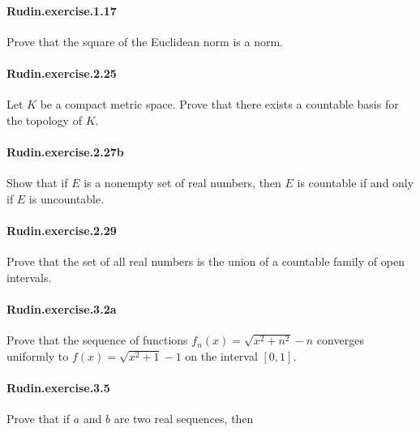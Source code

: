 \documentclass{article}
\begin{document}
\paragraph{Rudin.exercise.1.17} Prove that the square of the Euclidean norm is a norm.



\paragraph{Rudin.exercise.2.25} Let $K$ be a compact metric space. Prove that there exists a countable basis for the topology of $K$.

\paragraph{Rudin.exercise.2.27b} Show that if $E$ is a nonempty set of real numbers, then $E$ is countable if and only if $E$ is uncountable.

\paragraph{Rudin.exercise.2.29} Prove that the set of all real numbers is the union of a countable family of open intervals.

\paragraph{Rudin.exercise.3.2a} Prove that the sequence of functions $f_n(x) = \sqrt{x^2 + n^2} - n$ converges uniformly to $f(x) = \sqrt{x^2 + 1} - 1$ on the interval $[0, 1]$.

\paragraph{Rudin.exercise.3.5} Prove that if $a$ and $b$ are two real sequences, then
\end{document}

